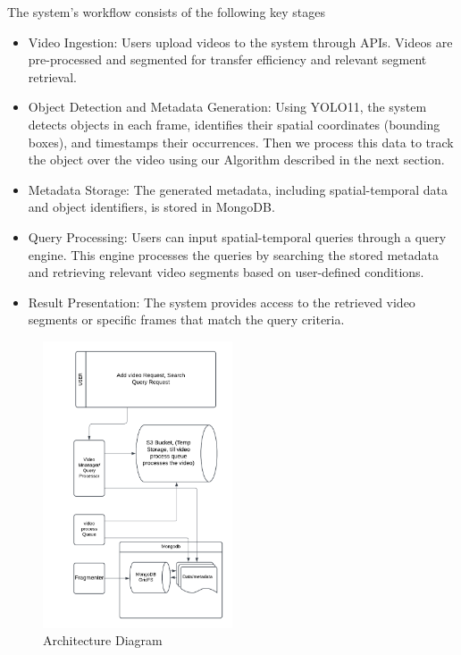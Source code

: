 \documentclass[conference]{IEEEtran}
\begin{document}
The system’s workflow consists of the following key stages
\begin{itemize} [itemsep=5pt]
    \item Video Ingestion: Users upload videos to the system through APIs. Videos are pre-processed and segmented for transfer efficiency and relevant segment retrieval.
    \item Object Detection and Metadata Generation: Using YOLO11\cite{yolo11}, the system detects objects in each frame, identifies their spatial coordinates (bounding boxes), and timestamps their occurrences. Then we process this data to track the object over the video using our Algorithm described in the next section.
    \item Metadata Storage: The generated metadata, including spatial-temporal data and object identifiers, is stored in MongoDB\cite{mongodb}.
    \item Query Processing: Users can input spatial-temporal queries through a query engine. This engine processes the queries by searching the stored metadata and retrieving relevant video segments based on user-defined conditions.
    \item Result Presentation: The system provides access to the retrieved video segments or specific frames that match the query criteria.
\end{itemize}


\begin{figure}[h!]
    \centering
    \includegraphics[width=0.5\textwidth]{architecture.png}
    \caption{Architecture Diagram}
    \label{fig:data_flow}
\end{figure}
\end{document}
